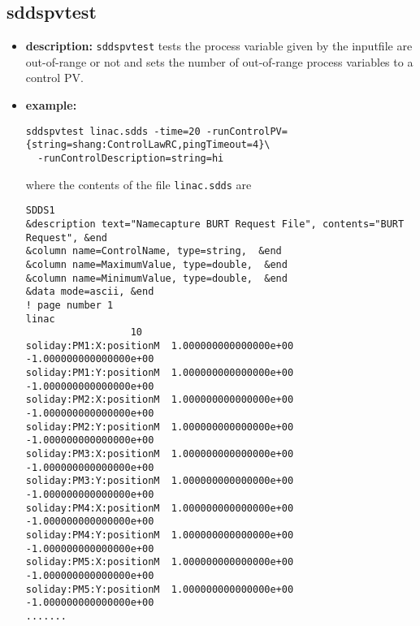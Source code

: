 %
%
\begin{latexonly}
\newpage
\end{latexonly}

%
%
\subsection{sddspvtest}
\label{sddspvtest}

\begin{itemize}
\item {\bf description:}
%
%
\verb+sddspvtest+ tests the process variable given by the inputfile are out-of-range
or not and sets the number of out-of-range process variables to a control PV.   

\item {\bf example:} 
%
% 
%
\begin{verbatim}
sddspvtest linac.sdds -time=20 -runControlPV={string=shang:ControlLawRC,pingTimeout=4}\
  -runControlDescription=string=hi
\end{verbatim}
where the contents of the file \verb+linac.sdds+ are
\begin{verbatim}
SDDS1
&description text="Namecapture BURT Request File", contents="BURT Request", &end
&column name=ControlName, type=string,  &end
&column name=MaximumValue, type=double,  &end
&column name=MinimumValue, type=double,  &end
&data mode=ascii, &end
! page number 1
linac
                  10
soliday:PM1:X:positionM  1.000000000000000e+00 -1.000000000000000e+00 
soliday:PM1:Y:positionM  1.000000000000000e+00 -1.000000000000000e+00 
soliday:PM2:X:positionM  1.000000000000000e+00 -1.000000000000000e+00 
soliday:PM2:Y:positionM  1.000000000000000e+00 -1.000000000000000e+00 
soliday:PM3:X:positionM  1.000000000000000e+00 -1.000000000000000e+00 
soliday:PM3:Y:positionM  1.000000000000000e+00 -1.000000000000000e+00 
soliday:PM4:X:positionM  1.000000000000000e+00 -1.000000000000000e+00 
soliday:PM4:Y:positionM  1.000000000000000e+00 -1.000000000000000e+00 
soliday:PM5:X:positionM  1.000000000000000e+00 -1.000000000000000e+00 
soliday:PM5:Y:positionM  1.000000000000000e+00 -1.000000000000000e+00 
.......

\end{verbatim}


\end{itemize}
